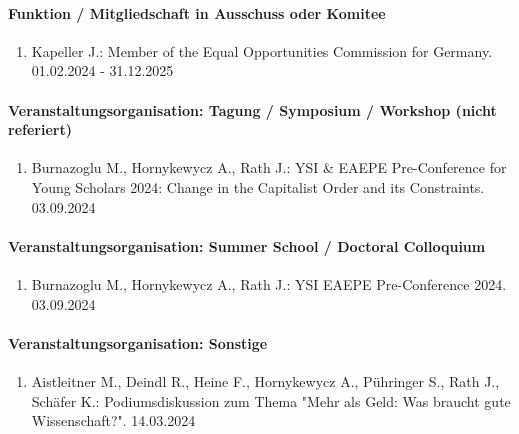 \paragraph{Funktion / Mitgliedschaft in Ausschuss oder Komitee}
\begin{enumerate}[leftmargin=*, labelsep=0.5cm]
\item Kapeller J.: Member of the Equal Opportunities Commission for Germany. 01.02.2024 - 31.12.2025
\end{enumerate}
\paragraph{Veranstaltungsorganisation: Tagung / Symposium / Workshop (nicht referiert)}
\begin{enumerate}[leftmargin=*, labelsep=0.5cm]
\item Burnazoglu M., Hornykewycz A., Rath J.: YSI \& EAEPE Pre-Conference for Young Scholars 2024: Change in the Capitalist Order and its Constraints. 03.09.2024
\end{enumerate}
\paragraph{Veranstaltungsorganisation: Summer School / Doctoral Colloquium}
\begin{enumerate}[leftmargin=*, labelsep=0.5cm]
\item Burnazoglu M., Hornykewycz A., Rath J.: YSI EAEPE Pre-Conference 2024. 03.09.2024
\end{enumerate}
\paragraph{Veranstaltungsorganisation: Sonstige}
\begin{enumerate}[leftmargin=*, labelsep=0.5cm]
\item Aistleitner M., Deindl R., Heine F., Hornykewycz A., Pühringer S., Rath J., Schäfer K.: Podiumsdiskussion zum Thema "Mehr als Geld: Was braucht gute Wissenschaft?". 14.03.2024
\end{enumerate}
